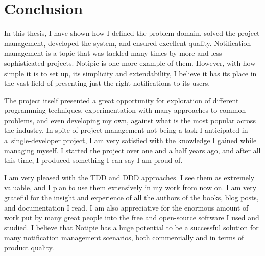 \section{Conclusion}\label{sec:conclusion}

In this thesis,
I have shown how I defined the problem domain,
solved the project management,
developed the system,
and ensured excellent quality.
Notification management is a topic
that was tackled many times by
more and less sophisticated projects.
Notipie is one more example of them.
However,
with how simple it is to set up,
its simplicity and extendability,
I believe it has its place
in the vast field of
presenting just the right notifications
to its users.

The project itself presented a great opportunity
for exploration of different programming techniques,
experimentation with many approaches to common problems,
and even developing my own,
against what is the most popular across the industry.
In spite of project management
not being a task I anticipated
in a~single-developer project,
I am very satisfied with the knowledge
I gained while managing myself.
I started the project over one and a half years ago,
and after all this time, I produced something
I can say I am proud of.

I am very pleased with the \ac{TDD} and \ac{DDD} approaches.
I see them as extremely valuable,
and I plan to use them extensively
in my work from now on.
I am very grateful for the insight
and experience of all the authors of the books,
blog posts, and documentation I read.
I am also appreciative for the enormous amount of work
put by many great people into
the free and open-source software
I used and studied.
I believe that Notipie has a huge potential
to be a successful solution for many
notification management scenarios,
both commercially
and in terms of product quality.
